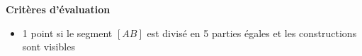 %
%
    \begin{center}
        
    \end{center}
    \textbf{Critères d'évaluation}
              \begin{itemize}
                  \item 1 point si le segment $[AB]$ est divisé en 5 parties égales et les constructions sont visibles
            \end{itemize}
